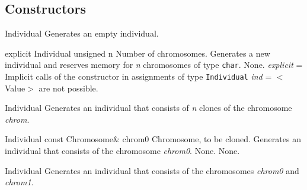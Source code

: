 \subsection{Constructors}

\setNormalInstance
\printEmptyMethod
{Individual}
{Generates an empty individual.}

\vspace*{4ex}

\setNormalInstance
\printMethodWithOneParam
{explicit}
{Individual}
{unsigned}
{n}
{Number of chromosomes.}
{Generates a new individual and reserves memory for
 {\em n} chromosomes of type {\tt char}.}
{None.}
{{\em explicit} = Implicit calls of the constructor in assignments of type
 {\tt Individual} {\em ind} = $<$Value$>$ are not possible.}

\clearpage

\setNormalInstance
\setCorrectWidthThree{8pt}
\printMethodWithParamsSaved
{}
{}
{Individual}
{Generates an individual that consists of {\em n} clones of the
 chromosome {\em chrom}.}
{}
\setCorrectWidthThree{4pt}

\vspace*{4ex}

\setNormalInstance
\printMethodWithOneParam
{}
{Individual}
{const Chromosome\&}
{chrom0}
{Chromosome, to be cloned.}
{Generates an individual that consists of the chromosome {\em chrom0}.}
{None.}
{None.}

\vspace*{4ex}

\setNormalInstance
\setCorrectWidthThree{8pt}
\printMethodWithParamsSaved
{}
{}
{Individual}
{Generates an individual that consists of the chromosomes {\em chrom0} 
 and {\em chrom1}.}
{}
\setCorrectWidthThree{4pt}

